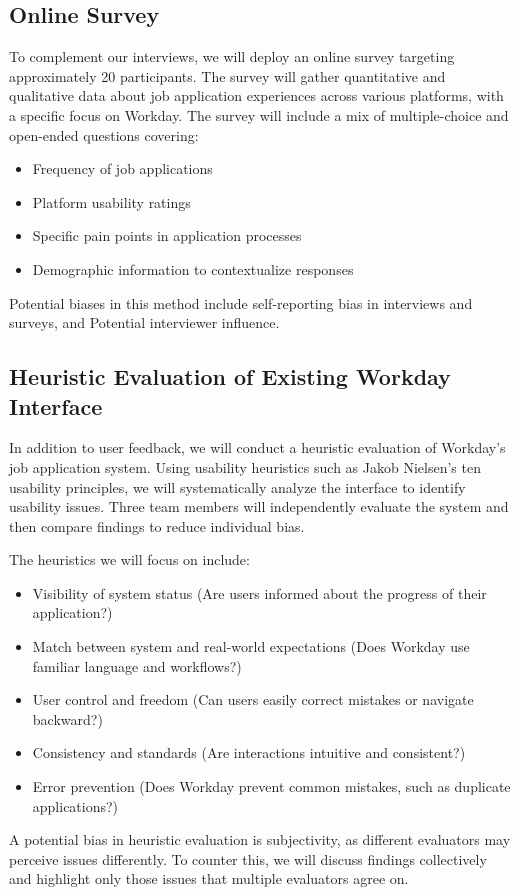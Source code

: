 \documentclass[
	letterpaper, %
]{jdf}
\begin{document}
\subsection {Online Survey}
To complement our interviews, we will deploy an online survey targeting approximately 20 participants. The survey will gather quantitative and qualitative data about job application experiences across various platforms, with a specific focus on Workday.
The survey will include a mix of multiple-choice and open-ended questions covering:
\begin{itemize}
    \item Frequency of job applications
    \item Platform usability ratings
    \item Specific pain points in application processes
    \item Demographic information to contextualize responses
\end{itemize}

Potential biases in this method include self-reporting bias in interviews and surveys, and Potential interviewer influence. 

\hfill \break
\subsection{Heuristic Evaluation of Existing Workday Interface}
In addition to user feedback, we will conduct a heuristic evaluation of Workday’s job application system. Using usability heuristics such as Jakob Nielsen’s ten usability principles, we will systematically analyze the interface to identify usability issues. Three team members will independently evaluate the system and then compare findings to reduce individual bias.

The heuristics we will focus on include:
\begin{itemize}
    \item Visibility of system status (Are users informed about the progress of their application?)
    \item Match between system and real-world expectations (Does Workday use familiar language and workflows?)
    \item User control and freedom (Can users easily correct mistakes or navigate backward?)
    \item Consistency and standards (Are interactions intuitive and consistent?)
    \item Error prevention (Does Workday prevent common mistakes, such as duplicate applications?)
\end{itemize}
A potential bias in heuristic evaluation is subjectivity, as different evaluators may perceive issues differently. To counter this, we will discuss findings collectively and highlight only those issues that multiple evaluators agree on.
\end{document}
